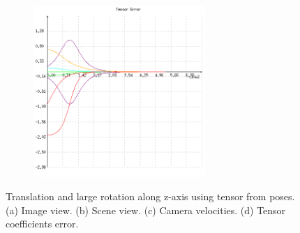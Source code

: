 \begin{figure}[ht!]
\begin{mdframed}[linecolor=black!30,backgroundcolor=black!5]
\begin{subfigure}{.48\linewidth}
    \caption{}
    \label{fig:ex4pvelocity}
  \end{subfigure}
  \begin{subfigure}{.48\linewidth}
    \centering
    \includegraphics[width=65mm]{figures/plots/ex4perror.png}
    \caption{}
    \label{fig:ex4perror}
  \end{subfigure}
  \caption{Translation and large rotation along z-axis using tensor from poses. (a) Image view. (b) Scene view. (c) Camera velocities. (d) Tensor coefficients error.}
  \label{fig:ex4p}
\end{mdframed}
\end{figure}

